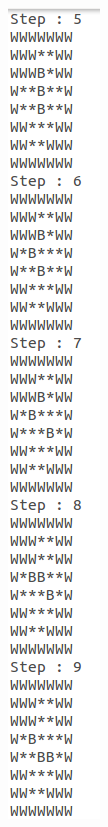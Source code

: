 \documentclass[10pt, letter]{article}
\begin{document}
\begin{figure} [h!]
\begin{subfigure}{.3\textwidth}
  \includegraphics[scale = 0.35]{images/sokobanC-ans2}
\end{subfigure}%
\begin{subfigure}{.3\textwidth}
  \centering

\end{subfigure}
\end{figure}
\end{document}
